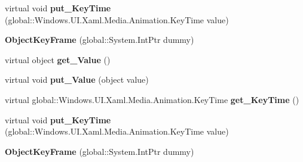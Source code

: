 \begin{DoxyCompactItemize}
virtual void {\bfseries put\+\_\+\+Key\+Time} (global\+::\+Windows.\+U\+I.\+Xaml.\+Media.\+Animation.\+Key\+Time value)
\item 
\mbox{\label{class_windows_1_1_u_i_1_1_xaml_1_1_media_1_1_animation_1_1_object_key_frame_ac48b6f8a34c2efefb0da6485e4eea19e}} 
{\bfseries Object\+Key\+Frame} (global\+::\+System.\+Int\+Ptr dummy)
\item 
\mbox{\label{class_windows_1_1_u_i_1_1_xaml_1_1_media_1_1_animation_1_1_object_key_frame_ad164bdb41cb8c8711d86923fe1b8e67c}} 
virtual object {\bfseries get\+\_\+\+Value} ()
\item 
\mbox{\label{class_windows_1_1_u_i_1_1_xaml_1_1_media_1_1_animation_1_1_object_key_frame_a7a88c4df7997178c63cfd7b1d90e0db7}} 
virtual void {\bfseries put\+\_\+\+Value} (object value)
\item 
\mbox{\label{class_windows_1_1_u_i_1_1_xaml_1_1_media_1_1_animation_1_1_object_key_frame_a6ae8fd2feca5365340534cb345435679}} 
virtual global\+::\+Windows.\+U\+I.\+Xaml.\+Media.\+Animation.\+Key\+Time {\bfseries get\+\_\+\+Key\+Time} ()
\item 
\mbox{\label{class_windows_1_1_u_i_1_1_xaml_1_1_media_1_1_animation_1_1_object_key_frame_a3d3dee8a9ef100ac928ef177d7c8ec55}} 
virtual void {\bfseries put\+\_\+\+Key\+Time} (global\+::\+Windows.\+U\+I.\+Xaml.\+Media.\+Animation.\+Key\+Time value)
\item 
\mbox{\label{class_windows_1_1_u_i_1_1_xaml_1_1_media_1_1_animation_1_1_object_key_frame_ac48b6f8a34c2efefb0da6485e4eea19e}} 
{\bfseries Object\+Key\+Frame} (global\+::\+System.\+Int\+Ptr dummy)
\item 
\mbox{\label{class_windows_1_1_u_i_1_1_xaml_1_1_media_1_1_animation_1_1_object_key_frame_ad164bdb41cb8c8711d86923fe1b8e67c}} 

\end{DoxyCompactItemize}
